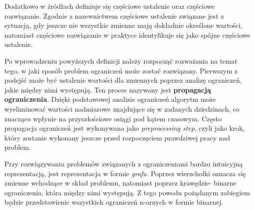     Dodatkowo w źródłach \cite{AI} definiuje się częściowe ustalenie oraz częściowe rozwiązanie. Zgodnie z nazewnictwem 
    częściowe ustalenie związane jest z sytuacją, gdy jeszcze nie wszystkie zmienne mają dokładnie określone wartości, natomiast 
    częściowe rozwiązanie w praktyce identyfikuje się jako spójne częściowe ustalenie.

    Po wprowadzeniu powyższych definicji należy rozpocząć rozważania na temat tego, w jaki sposób 
    problem ograniczeń może zostać rozwiązany. Pierwszym z podejść może być ustalenie wartości dla zmiennych poprzez 
    analizę ograniczeń, jakie między nimi występują. Ten proces nazywany jest \textbf{propagacją ograniczenia}. Dzięki 
    podstawowej analizie ograniczeń algorytm może wyeliminować wartości nadmiarowe znajdujące się w zadanych dziedzinach, co znacząco wpłynie 
    na przyszłościowe osiągi pod kątem czasowym. Często propagacja ograniczeń jest wykonywana jako \textit{preprocessing step}, czyli 
    jako krok, który zostanie wykonany jeszcze przed rozpoczęciem prawdziwej pracy nad problem. 
    
    Przy rozwiązywaniu problemów związanych z ograniczeniami bardzo intuicyjną reprezentacją, jest reprezentacja 
    w formie \textit{grafu}. Poprzez wierzchołki oznacza się zmienne wchodzące w skład problemu, natomiast poprzez krawędzie- 
    binarne ograniczenia, która między nimi występują. Z tego powodu pożądanym zabiegiem będzie przedstawienie wszystkich ograniczeń 
    n-arnych w formie binarnej.

